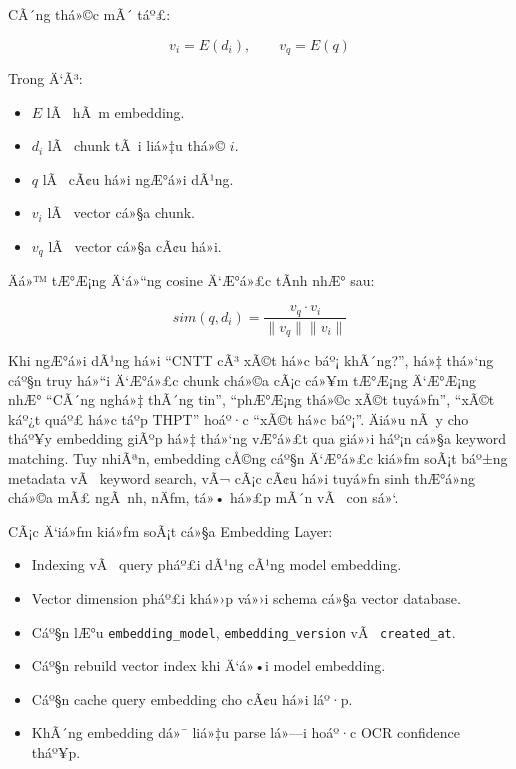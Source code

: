 ﻿\documentclass[12pt,a4paper]{report}
\begin{document}
CÃ´ng thá»©c mÃ´ táº£:

\begin{equation}
v_i = E(d_i), \qquad v_q = E(q)
\end{equation}

Trong Ä‘Ã³:

\begin{itemize}
    \item $E$ lÃ  hÃ m embedding.
    \item $d_i$ lÃ  chunk tÃ i liá»‡u thá»© $i$.
    \item $q$ lÃ  cÃ¢u há»i ngÆ°á»i dÃ¹ng.
    \item $v_i$ lÃ  vector cá»§a chunk.
    \item $v_q$ lÃ  vector cá»§a cÃ¢u há»i.
\end{itemize}

Äá»™ tÆ°Æ¡ng Ä‘á»“ng cosine Ä‘Æ°á»£c tÃ­nh nhÆ° sau:

\begin{equation}
sim(q, d_i) = \frac{v_q \cdot v_i}{\|v_q\| \|v_i\|}
\end{equation}

Khi ngÆ°á»i dÃ¹ng há»i ``CNTT cÃ³ xÃ©t há»c báº¡ khÃ´ng?'', há»‡ thá»‘ng cáº§n truy há»“i Ä‘Æ°á»£c chunk chá»©a cÃ¡c cá»¥m tÆ°Æ¡ng Ä‘Æ°Æ¡ng nhÆ° ``CÃ´ng nghá»‡ thÃ´ng tin'', ``phÆ°Æ¡ng thá»©c xÃ©t tuyá»ƒn'', ``xÃ©t káº¿t quáº£ há»c táº­p THPT'' hoáº·c ``xÃ©t há»c báº¡''. Äiá»u nÃ y cho tháº¥y embedding giÃºp há»‡ thá»‘ng vÆ°á»£t qua giá»›i háº¡n cá»§a keyword matching. Tuy nhiÃªn, embedding cÅ©ng cáº§n Ä‘Æ°á»£c kiá»ƒm soÃ¡t báº±ng metadata vÃ  keyword search, vÃ¬ cÃ¡c cÃ¢u há»i tuyá»ƒn sinh thÆ°á»ng chá»©a mÃ£ ngÃ nh, nÄƒm, tá»• há»£p mÃ´n vÃ  con sá»‘.

CÃ¡c Ä‘iá»ƒm kiá»ƒm soÃ¡t cá»§a Embedding Layer:

\begin{itemize}
    \item Indexing vÃ  query pháº£i dÃ¹ng cÃ¹ng model embedding.
    \item Vector dimension pháº£i khá»›p vá»›i schema cá»§a vector database.
    \item Cáº§n lÆ°u \texttt{embedding\_model}, \texttt{embedding\_version} vÃ  \texttt{created\_at}.
    \item Cáº§n rebuild vector index khi Ä‘á»•i model embedding.
    \item Cáº§n cache query embedding cho cÃ¢u há»i láº·p.
    \item KhÃ´ng embedding dá»¯ liá»‡u parse lá»—i hoáº·c OCR confidence tháº¥p.
\end{itemize}
\end{document}
